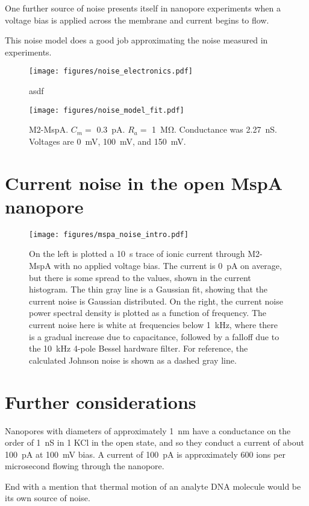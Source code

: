 One further source of noise presents itself in nanopore experiments when a voltage bias is applied across the membrane and current begins to flow.

This noise model does a good job approximating the noise measured in experiments.

\begin{figure}[h]
\begin{centering}
\texttt{[image: figures/noise\_electronics.pdf]}
\caption[Current noise in the MspA nanopore]{asdf}
\label{fig:mspa_noise_intro}
\end{centering}
\end{figure}

\begin{figure}[h]
\begin{centering}
\texttt{[image: figures/noise\_model\_fit.pdf]}
\caption[Current noise in the MspA nanopore]{M2-MspA.  $C_m = $ \SI{0.3}{\pA}. $R_a = $ \SI{1}{\mega\ohm}.  Conductance was \SI{2.27}{\nano\siemens}.  Voltages are \SI{0}{\mV}, \SI{100}{\mV}, and \SI{150}{\mV}.}
\label{fig:mspa_noise_intro}
\end{centering}
\end{figure}



\section{Current noise in the open MspA nanopore}

\begin{figure}[h]
\begin{centering}
\texttt{[image: figures/mspa\_noise\_intro.pdf]}
\caption[Current noise in the MspA nanopore]{On the left is plotted a \SI{10}{\s} trace of ionic current through M2-MspA with no applied voltage bias.  The current is \SI{0}{\pA} on average, but there is some spread to the values, shown in the current histogram.  The thin gray line is a Gaussian fit, showing that the current noise is Gaussian distributed.  On the right, the current noise power spectral density is plotted as a function of frequency.  The current noise here is white at frequencies below \SI{1}{\kHz}, where there is a gradual increase due to capacitance, followed by a falloff due to the \SI{10}{\kHz} 4-pole Bessel hardware filter.  For reference, the calculated Johnson noise is shown as a dashed gray line.}
\label{fig:mspa_noise_intro}
\end{centering}
\end{figure}

\section{Further considerations}

Nanopores with diameters of approximately \SI{1}{\nm} have a conductance on the order of \SI{1}{\nano\siemens} in \SI{1}{\Molar} KCl in the open state, and so they conduct a current of about \SI{100}{\pA} at \SI{100}{\mV} bias.  A current of \SI{100}{\pA} is approximately \num{600} ions per microsecond flowing through the nanopore.

End with a mention that thermal motion of an analyte DNA molecule would be its own source of noise.